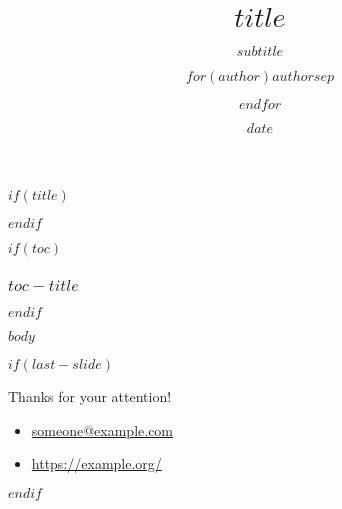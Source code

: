 \documentclass[
  $if(fontsize)$
    $fontsize$,
  $endif$
  $if(handout)$
    handout,
  $endif$
  $if(aspectratio)$
    aspectratio = $aspectratio$,
  $endif$
]{beamer}
\title{$title$}
\subtitle{$subtitle$}
\author{$for(author)$$author$$sep$ \and $endfor$}
\date{$date$}
\institute{$for(institute)$$institute$$sep$ \and $endfor$}
\begin{document}
$if(title)$
  \begin{frame}[plain]{}
    \titlepage
  \end{frame}
$endif$

$if(toc)$
  \begin{frame}
    \frametitle{$toc-title$}
    \tableofcontents
  \end{frame}
$endif$

$body$

$if(last-slide)$
  \begin{frame}{}
      \vspace{0.5cm}
      \begin{center}
          {\Large Thanks for your attention!}
      \end{center}
      \vfill
      \begin{itemize}
        \item[\faEnvelope] \href{mailto:someone@example.com}{someone@example.com} \\
        \item[\faLaptop] \href{https://example.org/}{https://example.org/}
      \end{itemize}
  \end{frame}
$endif$
\end{document}
